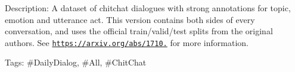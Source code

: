 Description\+: A dataset of chitchat dialogues with strong annotations for topic, emotion and utterance act. This version contains both sides of every conversation, and uses the official train/valid/test splits from the original authors. See \href{https://arxiv.org/abs/1710.03957}{\tt https\+://arxiv.\+org/abs/1710.} for more information.

Tags\+: \#\+Daily\+Dialog, \#\+All, \#\+Chit\+Chat 